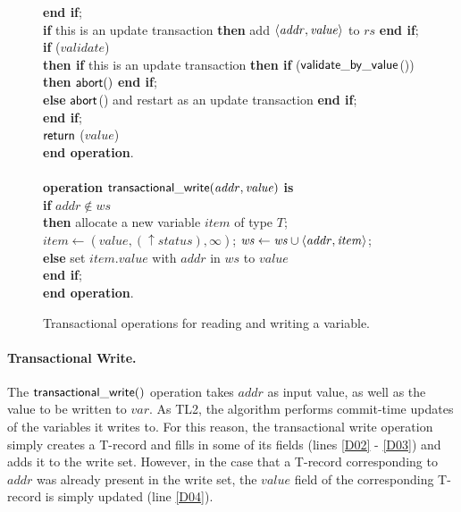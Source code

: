 \begin{figure} [htb]
{{\begin{minipage}[t]{1\linewidth}
\begin{tabbing}
 \> {\bf end if}; \\

 \> {\bf if} this is an update transaction
                        {\bf then} add $\left \langle \mathit{addr,value} \right \rangle $ to $\mathit{rs}$ {\bf end if}; \\

 \> {\bf if} ($\mathit{validate}$) \\
 \>\> {\bf then if} this is an update transaction {\bf then if} (${\sf validate\_by\_value}$()) {\bf then} $\sf{abort}()$ {\bf end if}; \\
 \>\>\>\> {\bf else} ${\sf abort}$() and restart as an update transaction {\bf end if}; \\


 \> {\bf end if}; \\


 \> ${\sf return}$ ($\mathit{value}$) \\
{\bf end operation}. \\
\\
{\bf operation}  ${\sf transactional\_write}(\mathit{addr, value})$ {\bf is}\\
 \> {\bf if} $\mathit{addr} \not\in \mathit{ws}$  \\
 \>\> {\bf then} \> allocate a new variable $item$ of type $T$; \\
 \>\>\> $\mathit{item}  \gets (\mathit{value, (\uparrow status), \infty})$; 
                   $\mathit{ws} \gets \mathit{ws} \cup \left \langle \mathit{addr, item} \right \rangle $; \\
 \>\> {\bf else} \> set $\mathit{item.value}$ with $\mathit{addr}$ in $\mathit{ws}$ to $\mathit{value}$ \\
 \> {\bf end if}; \\
{\bf end operation}.
\end{tabbing}
\normalsize
\end{minipage}
}
\caption{Transactional operations for reading and writing a variable.}
\label{fig:tops}
}
\end{figure}

\paragraph{Transactional Write.}
The ${\sf transactional\_write()}$ operation
takes $\mathit{addr}$ as input value, as well as the value 
to be written to $\mathit{var}$. As  TL2, the algorithm 
performs commit-time updates of the variables it writes to. 
For this reason, the transactional write  
operation simply creates a T-record and fills in some of its 
fields (lines \ref{D02} - \ref{D03}) and 
adds it to the write set.
However, in the case that a T-record corresponding to $\mathit{addr}$  was
already present in  the write set, the
$\mathit{value}$ field of the corresponding  
T-record is simply updated (line \ref{D04}).


